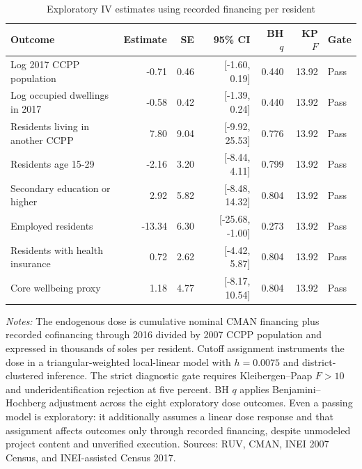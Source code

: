 \begin{table}[!htbp]
\centering
\caption{Exploratory IV estimates using recorded financing per resident}
\label{tab:hte-2017-ccpp-financing-dose}
\small
\begin{tabular}{lrrrrrl}
\toprule
Outcome & Estimate & SE & 95\% CI & BH \(q\) & KP \(F\) & Gate \\
\midrule
Log 2017 CCPP population & -0.71 & 0.46 & [-1.60, 0.19] & 0.440 & 13.92 & Pass \\
Log occupied dwellings in 2017 & -0.58 & 0.42 & [-1.39, 0.24] & 0.440 & 13.92 & Pass \\
Residents living in another CCPP & 7.80 & 9.04 & [-9.92, 25.53] & 0.776 & 13.92 & Pass \\
Residents age 15-29 & -2.16 & 3.20 & [-8.44, 4.11] & 0.799 & 13.92 & Pass \\
Secondary education or higher & 2.92 & 5.82 & [-8.48, 14.32] & 0.804 & 13.92 & Pass \\
Employed residents & -13.34 & 6.30 & [-25.68, -1.00] & 0.273 & 13.92 & Pass \\
Residents with health insurance & 0.72 & 2.62 & [-4.42, 5.87] & 0.804 & 13.92 & Pass \\
Core wellbeing proxy & 1.18 & 4.77 & [-8.17, 10.54] & 0.804 & 13.92 & Pass \\
\bottomrule
\end{tabular}
\parbox{0.97\linewidth}{\footnotesize \textit{Notes:} The endogenous dose is cumulative nominal CMAN financing plus recorded cofinancing through 2016 divided by 2007 CCPP population and expressed in thousands of soles per resident. Cutoff assignment instruments the dose in a triangular-weighted local-linear model with \(h=0.0075\) and district-clustered inference. The strict diagnostic gate requires Kleibergen--Paap \(F>10\) and underidentification rejection at five percent. BH \(q\) applies Benjamini--Hochberg adjustment across the eight exploratory dose outcomes. Even a passing model is exploratory: it additionally assumes a linear dose response and that assignment affects outcomes only through recorded financing, despite unmodeled project content and unverified execution. Sources: RUV, CMAN, INEI 2007 Census, and INEI-assisted Census 2017.}
\end{table}
